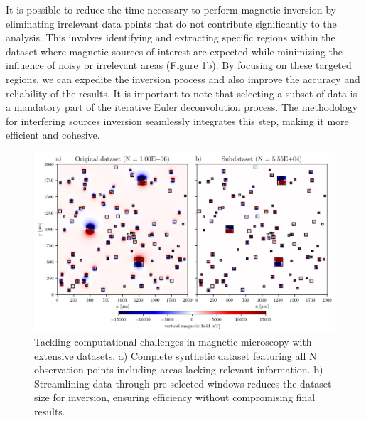 It is possible to reduce the time necessary to perform magnetic inversion by eliminating irrelevant data points that do not contribute significantly to the analysis. This involves identifying and extracting specific regions within the dataset where magnetic sources of interest are expected while minimizing the influence of noisy or irrelevant areas (Figure \ref{methodology}b). By focusing on these targeted regions, we can expedite the inversion process and also improve the accuracy and reliability of the results. It is important to note that selecting a subset of data is a mandatory part of the iterative Euler deconvolution process. The methodology for interfering sources inversion seamlessly integrates this step, making it more efficient and cohesive.


\begin{figure}[tb!]
  \centering
  \includegraphics[width=1\linewidth]{figures/methodology.png}
  \caption{
    Tackling computational challenges in magnetic microscopy with extensive datasets.
    a) Complete synthetic dataset featuring all N observation points including areas lacking relevant information.
    b) Streamlining data through pre-selected windows reduces the dataset size for inversion, ensuring efficiency without compromising final results.
      }
  \label{methodology}
\end{figure}

